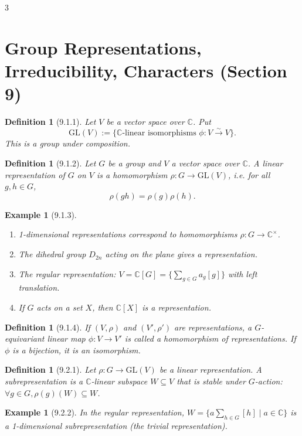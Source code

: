 \documentclass[10pt,landscape]{article}
\newtheorem{definition}[theorem]{Definition}
\newtheorem{example}[theorem]{Example}
\begin{document}
\begin{multicols}{3}
\section{Group Representations, Irreducibility, Characters (Section 9)}

\begin{definition}[9.1.1]
Let $V$ be a vector space over $\mathbb{C}$. Put
\[
\mathrm{GL}(V) := \{\mathbb{C}\text{-linear isomorphisms } \phi: V \stackrel{\sim}{\to} V\}.
\]
This is a group under composition.
\end{definition}

\begin{definition}[9.1.2]
Let $G$ be a group and $V$ a vector space over $\mathbb{C}$. A linear representation of $G$ on $V$ is a homomorphism $\rho: G \to \mathrm{GL}(V)$, i.e. for all $g,h\in G$,
\[
\rho(gh) = \rho(g)\rho(h).
\]
\end{definition}

\begin{example}[9.1.3]
\begin{enumerate}
\item 1-dimensional representations correspond to homomorphisms $\rho: G \to \mathbb{C}^\times$.
\item The dihedral group $D_{2n}$ acting on the plane gives a representation.
\item The regular representation: $V = \mathbb{C}[G] = \{\sum_{g\in G} a_g [g]\}$ with left translation.
\item If $G$ acts on a set $X$, then $\mathbb{C}[X]$ is a representation.
\end{enumerate}
\end{example}

\begin{definition}[9.1.4]
If $(V,\rho)$ and $(V',\rho')$ are representations, a $G$-equivariant linear map $\phi: V\to V'$ is called a homomorphism of representations. If $\phi$ is a bijection, it is an isomorphism.
\end{definition}

\begin{definition}[9.2.1]
Let $\rho: G\to \mathrm{GL}(V)$ be a linear representation. A subrepresentation is a $\mathbb{C}$-linear subspace $W\subseteq V$ that is stable under $G$-action: $\forall g\in G, \rho(g)(W)\subseteq W$.
\end{definition}

\begin{example}[9.2.2]
In the regular representation, $W = \{a\sum_{h\in G}[h] \mid a\in\mathbb{C}\}$ is a 1-dimensional subrepresentation (the trivial representation).
\end{example}


\end{multicols}
\end{document}
